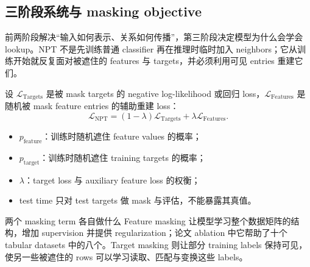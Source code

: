 

\subsection{三阶段系统与 masking objective}

前两阶段解决“输入如何表示、关系如何传播”，第三阶段决定模型为什么会学会 lookup。NPT 不是先训练普通 classifier 再在推理时临时加入 neighbors；它从训练开始就反复面对被遮住的 features 与 targets，并必须利用可见 entries 重建它们。



设 $\mathcal{L}_{\mathrm{Targets}}$ 是被 mask targets 的 negative log-likelihood 或回归 loss，$\mathcal{L}_{\mathrm{Features}}$ 是随机被 mask feature entries 的辅助重建 loss：
\[
\mathcal{L}_{\mathrm{NPT}}
=(1-\lambda)\mathcal{L}_{\mathrm{Targets}}
+\lambda\mathcal{L}_{\mathrm{Features}}.
\]

\begin{itemize}
  \item $p_{\mathrm{feature}}$：训练时随机遮住 feature values 的概率；
  \item $p_{\mathrm{target}}$：训练时随机遮住 training targets 的概率；
  \item $\lambda$：target loss 与 auxiliary feature loss 的权衡；
  \item test time 只对 test targets 做 mask 与评估，不能暴露其真值。
\end{itemize}

\begin{knowledgebox}{两个 masking term 各自做什么}
Feature masking 让模型学习整个数据矩阵的结构，增加 supervision 并提供 regularization；论文 ablation 中它帮助了十个 tabular datasets 中的八个。Target masking 则让部分 training labels 保持可见，使另一些被遮住的 rows 可以学习读取、匹配与变换这些 labels。
\end{knowledgebox}

